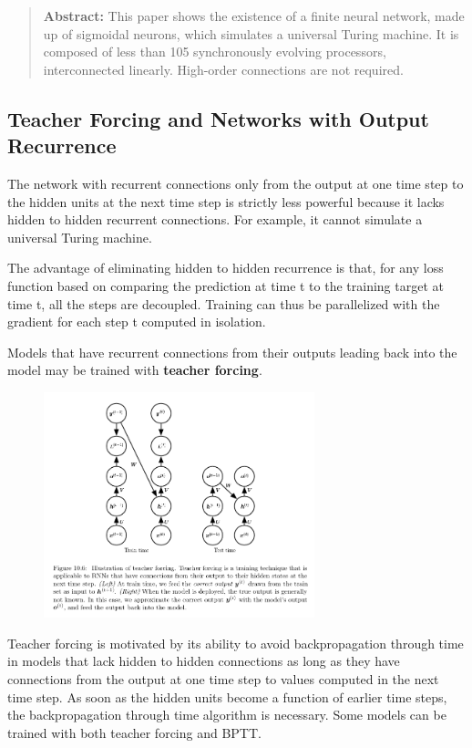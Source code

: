 \documentclass[letterpaper, 12pt]{report}
\begin{document}
\begin{quote}
  \textbf{Abstract: } This paper shows the existence of a finite
  neural network, made up of sigmoidal neurons, which simulates a
  universal Turing machine. It is composed of less than 105
  synchronously evolving processors, interconnected
  linearly. High-order connections are not required.
\end{quote}

\subsection{Teacher Forcing and Networks with Output Recurrence}

The network with recurrent connections only from the output at one time step to the hidden units at the next time step is strictly less powerful because it lacks hidden to hidden recurrent connections. For example, it cannot simulate a universal Turing machine. 

The advantage of eliminating hidden to hidden recurrence is that, for any loss function based on comparing the prediction at time t to the training target at time t, all the steps are decoupled. Training can thus be parallelized with the gradient for each step t computed in isolation. 

Models that have recurrent connections from their outputs leading back into the model may be trained with \textbf{teacher forcing}. 

\begin{figure}[h]
  \centering
  \includegraphics[width=0.7\textwidth]{teacher_forcing.png}
\end{figure}

Teacher forcing is motivated by its ability to avoid backpropagation through time in models that lack hidden to hidden connections as long as they have connections from the output at one time step to values computed in the next time step. As soon as the hidden units become a function of earlier time steps, the backpropagation through time algorithm is necessary. Some models can be trained with both teacher forcing and BPTT.
\end{document}
